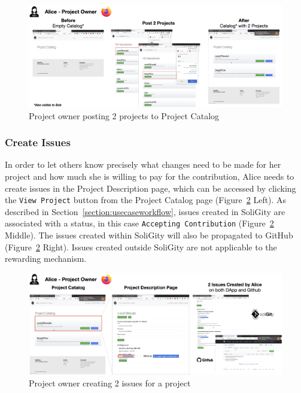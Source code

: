 \documentclass[12pt]{article}
\renewcommand{\_}{\kern-1.5pt\textunderscore\kern-1.5pt}
\begin{document}
\begin{figure}[H]
	\centering
	\includegraphics[width=16cm]{graphs/50. post_1.png}
	\caption{Project owner posting 2 projects to Project Catalog}
	\label{fig:post1}
\end{figure}

\subsubsection{Create Issues}

In order to let others know precisely what changes need to be made for her project and how much she
is willing to pay for the contribution, Alice needs to create issues in the Project Description page,
which can be accessed by clicking the \texttt{View Project} button from the Project Catalog page
(Figure~\ref{fig:post2} Left). As described in Section~\ref{section:usecaseworkflow}, issues created
in SoliGity are associated with a status, in this case \texttt{Accepting Contribution} (Figure~\ref{fig:post2} Middle).
The issues created within SoliGity will also be propagated to GitHub (Figure~\ref{fig:post2} Right).
Issues created outside SoliGity are not applicable to the rewarding mechanism.

\begin{figure}[H]
	\centering
	\includegraphics[width=16cm]{graphs/51. post_2.png}
	\caption{Project owner creating 2 issues for a project}
	\label{fig:post2}
\end{figure}
\end{document}
